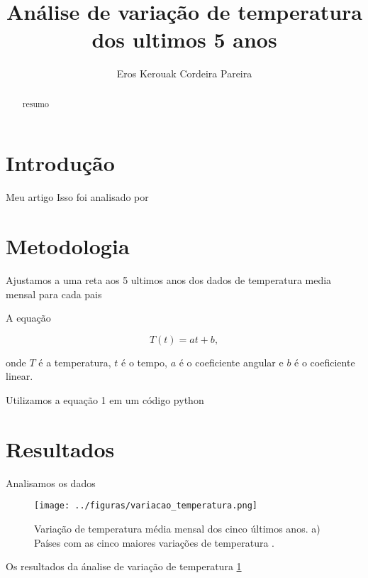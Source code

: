 \documentclass{article}
\begin{document}
\title{Análise de variação de temperatura dos ultimos 5 anos}

\author{Eros Kerouak Cordeira Pareira}

\maketitle 

\begin{abstract}
resumo
\end{abstract}

\section{Introdução}

Meu artigo \citep{cheng2014impact}
Isso foi analisado por \citet{cheng2014impact}

\section{Metodologia}

Ajustamos a uma reta aos 5 ultimos anos dos dados de temperatura media mensal para cada pais 

A equação

\begin{equation}
T(t) = a t + b ,
\label{eq:reta}
\end{equation}

\noindent
onde $T$ é a temperatura, $t$ é o tempo, $a$ é o coeficiente angular e $b$ é o coeficiente linear.

Utilizamos a equação 1 em um código python 

\section{Resultados}

Analisamos os dados 


\begin{figure}[!htb]
	\texttt{[image: ../figuras/variacao\_temperatura.png]}
	\caption{
		Variação de temperatura média mensal dos cinco últimos anos.
		a) Países com as cinco maiores variações de temperatura .
	}
	\label{fig:variacao}
\end{figure}

Os resultados da ánalise de variação de temperatura \ref{fig:variacao}
\Paises





\end{document}
